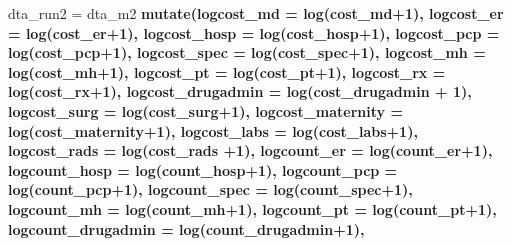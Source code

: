 \documentclass[]{article}
\newenvironment{Shaded}{\begin{snugshade}}{\end{snugshade}}
\newcommand{\KeywordTok}[1]{\textcolor[rgb]{0.13,0.29,0.53}{\textbf{#1}}}
\newcommand{\DataTypeTok}[1]{\textcolor[rgb]{0.13,0.29,0.53}{#1}}
\newcommand{\DecValTok}[1]{\textcolor[rgb]{0.00,0.00,0.81}{#1}}
\newcommand{\StringTok}[1]{\textcolor[rgb]{0.31,0.60,0.02}{#1}}
\newcommand{\OperatorTok}[1]{\textcolor[rgb]{0.81,0.36,0.00}{\textbf{#1}}}
\newcommand{\NormalTok}[1]{#1}
\begin{document}
\begin{Shaded}
\begin{Highlighting}[]
\NormalTok{dta_run2 =}\StringTok{ }\NormalTok{dta_m2 }\OperatorTok{%>%}
\StringTok{  }\KeywordTok{mutate}\NormalTok{(}\DataTypeTok{logcost_md =} \KeywordTok{log}\NormalTok{(cost_md}\OperatorTok{+}\DecValTok{1}\NormalTok{),}
         \DataTypeTok{logcost_er =} \KeywordTok{log}\NormalTok{(cost_er}\OperatorTok{+}\DecValTok{1}\NormalTok{),}
         \DataTypeTok{logcost_hosp =} \KeywordTok{log}\NormalTok{(cost_hosp}\OperatorTok{+}\DecValTok{1}\NormalTok{),}
         \DataTypeTok{logcost_pcp =} \KeywordTok{log}\NormalTok{(cost_pcp}\OperatorTok{+}\DecValTok{1}\NormalTok{),}
         \DataTypeTok{logcost_spec =} \KeywordTok{log}\NormalTok{(cost_spec}\OperatorTok{+}\DecValTok{1}\NormalTok{),}
         \DataTypeTok{logcost_mh =} \KeywordTok{log}\NormalTok{(cost_mh}\OperatorTok{+}\DecValTok{1}\NormalTok{),}
         \DataTypeTok{logcost_pt =} \KeywordTok{log}\NormalTok{(cost_pt}\OperatorTok{+}\DecValTok{1}\NormalTok{),}
         \DataTypeTok{logcost_rx =} \KeywordTok{log}\NormalTok{(cost_rx}\OperatorTok{+}\DecValTok{1}\NormalTok{),}
         \DataTypeTok{logcost_drugadmin =} \KeywordTok{log}\NormalTok{(cost_drugadmin }\OperatorTok{+}\StringTok{ }\DecValTok{1}\NormalTok{),}
         \DataTypeTok{logcost_surg =} \KeywordTok{log}\NormalTok{(cost_surg}\OperatorTok{+}\DecValTok{1}\NormalTok{),}
         \DataTypeTok{logcost_maternity =} \KeywordTok{log}\NormalTok{(cost_maternity}\OperatorTok{+}\DecValTok{1}\NormalTok{),}
         \DataTypeTok{logcost_labs =} \KeywordTok{log}\NormalTok{(cost_labs}\OperatorTok{+}\DecValTok{1}\NormalTok{),}
         \DataTypeTok{logcost_rads =} \KeywordTok{log}\NormalTok{(cost_rads }\OperatorTok{+}\DecValTok{1}\NormalTok{),}
         \DataTypeTok{logcount_er =} \KeywordTok{log}\NormalTok{(count_er}\OperatorTok{+}\DecValTok{1}\NormalTok{),}
         \DataTypeTok{logcount_hosp =} \KeywordTok{log}\NormalTok{(count_hosp}\OperatorTok{+}\DecValTok{1}\NormalTok{),}
         \DataTypeTok{logcount_pcp =} \KeywordTok{log}\NormalTok{(count_pcp}\OperatorTok{+}\DecValTok{1}\NormalTok{),}
         \DataTypeTok{logcount_spec =} \KeywordTok{log}\NormalTok{(count_spec}\OperatorTok{+}\DecValTok{1}\NormalTok{),}
         \DataTypeTok{logcount_mh =} \KeywordTok{log}\NormalTok{(count_mh}\OperatorTok{+}\DecValTok{1}\NormalTok{),}
         \DataTypeTok{logcount_pt =} \KeywordTok{log}\NormalTok{(count_pt}\OperatorTok{+}\DecValTok{1}\NormalTok{),}
         \DataTypeTok{logcount_drugadmin =} \KeywordTok{log}\NormalTok{(count_drugadmin}\OperatorTok{+}\DecValTok{1}\NormalTok{),}
}
\end{Highlighting}
\end{Shaded}
\end{document}
